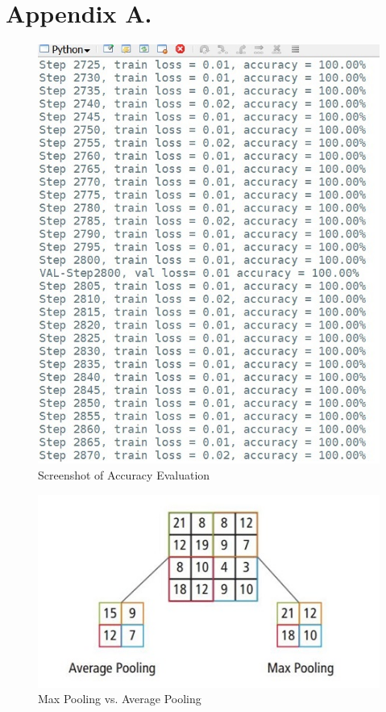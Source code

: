 \documentclass[twoside,11pt]{article}
\begin{document}
\section*{Appendix A.}
\begin{figure}[htbp]
\centering
\includegraphics[width=.8\textwidth]{figure7.jpg}
\caption{Screenshot of Accuracy Evaluation}
\label{figure1}
\end{figure}


\begin{figure}[htbp]
\centering
\includegraphics[width=.8\textwidth]{figure4.JPG}
\caption{Max Pooling vs. Average Pooling }
\label{figure1}
\end{figure}
\end{document}
